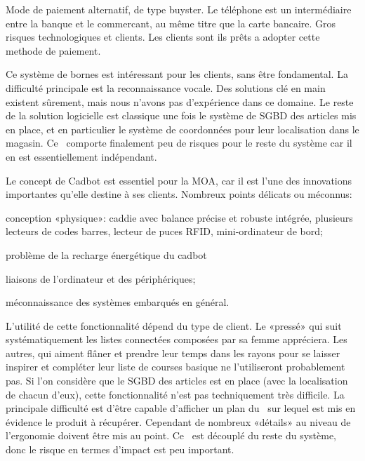\startnote
{} Mode de paiement alternatif, de type buyster. Le téléphone est un intermédiaire entre la banque et le commercant, au même titre que la carte bancaire. 
 Gros risques technologiques et clients. Les clients sont ils prêts a adopter cette methode de paiement.
\stopnote

\startnote
{} Ce système de bornes est intéressant pour les clients, sans être fondamental.
 La difficulté principale est la reconnaissance vocale. 
Des solutions clé en main existent sûrement, mais nous n'avons pas d'expérience dans ce domaine.
Le reste de la solution logicielle est classique une fois le système de SGBD des articles mis en place, et en particulier le système de coordonnées pour leur localisation dans le magasin.
Ce \cu\ comporte finalement peu de risques pour le reste du système car il en est essentiellement indépendant.
\stopnote

\startnote
{} Le concept de Cadbot est essentiel pour la MOA, car il est l'une des innovations importantes qu'elle destine à ses clients.
 Nombreux points délicats ou méconnus:
\startitemize
\item conception «physique»: caddie avec balance précise et robuste intégrée, plusieurs lecteurs de codes barres, lecteur de puces RFID, mini-ordinateur de bord;
\item problème de la recharge énergétique du cadbot
\item liaisons de l'ordinateur et des périphériques;
\item méconnaissance des systèmes embarqués en général.
\stopitemize
\stopnote

\startnote
{} L'utilité de cette fonctionnalité dépend du type de client.
Le «pressé» qui suit systématiquement les listes connectées composées par sa femme appréciera.
Les autres, qui aiment flâner et prendre leur temps dans les rayons pour se laisser inspirer et compléter leur liste de courses basique ne l'utiliseront probablement pas.
Si l'on considère que le SGBD des articles est en place (avec la localisation de chacun d'eux), cette fonctionnalité n'est pas techniquement très difficile.
La principale difficulté est d'être capable d'afficher un plan du \fm\ sur lequel est mis en évidence le produit à récupérer.
Cependant de nombreux «détails» au niveau de l'ergonomie doivent être mis au point.
Ce \cu\ est découplé du reste du système, donc le risque en termes d'impact est peu important.
\stopnote

